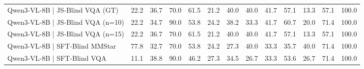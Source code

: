 \begin{tabular}{lrrrrrrrrrrrr}
Qwen3‑VL‑8B | JS‑Blind VQA (GT) & 22.2 & 36.7 & 70.0 & 61.5 & 21.2 & 40.0 & 40.0 & 41.7 & 57.1 & 13.3 & 57.1 & 100.0 \\
Qwen3‑VL‑8B | JS‑Blind VQA (n=10) & 22.2 & 34.7 & 90.0 & 53.8 & 24.2 & 38.2 & 33.3 & 41.7 & 60.7 & 20.0 & 71.4 & 100.0 \\
Qwen3‑VL‑8B | JS‑Blind VQA (n=15) & 22.2 & 36.7 & 70.0 & 61.5 & 21.2 & 40.0 & 40.0 & 41.7 & 57.1 & 13.3 & 57.1 & 100.0 \\
Qwen3‑VL‑8B | SFT‑Blind MMStar & 77.8 & 32.7 & 70.0 & 53.8 & 24.2 & 27.3 & 40.0 & 33.3 & 35.7 & 40.0 & 71.4 & 100.0 \\
Qwen3‑VL‑8B | SFT‑Blind VQA & 11.1 & 38.8 & 90.0 & 46.2 & 27.3 & 34.5 & 26.7 & 33.3 & 53.6 & 26.7 & 71.4 & 100.0 \\
\bottomrule
\end{tabular}
